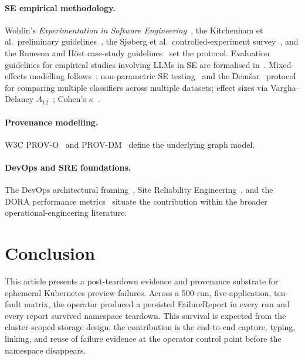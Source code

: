 \documentclass[sigconf, nonacm=true, anonymous=false, review=false]{acmart}
\newcommand{\fp}{FailureReport\xspace}
\begin{document}
\paragraph{SE empirical methodology.} Wohlin's
\emph{Experimentation in Software Engineering}~\cite{wohlin_experimentation},
the Kitchenham et al.\ preliminary
guidelines~\cite{kitchenham_2002}, the Sj{\o}berg et al.\
controlled-experiment survey~\cite{sjoberg_2005}, and the Runeson
and H{\"o}st case-study guidelines~\cite{runeson_host_2009} set the
protocol. Evaluation guidelines for empirical studies involving
LLMs in SE are formalised in~\cite{se_llm_guidelines}.
Mixed-effects modelling follows~\cite{bates_lme4_2015,
baayen_2008, brown_lmm_2021}; non-parametric SE
testing~\cite{arcuri_briand_2014} and the
Dem{\v{s}}ar~\cite{demsar_2006} protocol for comparing multiple
classifiers across multiple datasets; effect sizes via
Vargha--Delaney $A_{12}$~\cite{vargha_delaney_2000};
Cohen's $\kappa$~\cite{mchugh_kappa_2012}.

\paragraph{Provenance modelling.} W3C PROV-O~\cite{lebo_provo_2013}
and PROV-DM~\cite{w3c_prov_dm} define the underlying graph model.

\paragraph{DevOps and SRE foundations.} The DevOps architectural
framing~\cite{bass_devops_2015}, Site Reliability
Engineering~\cite{beyer_sre_2016}, and the DORA performance
metrics~\cite{forsgren_accelerate_2018} situate the contribution
within the broader operational-engineering literature.

\section{Conclusion}
\label{sec:conclusion}

This article presents a post-teardown evidence and provenance substrate for
ephemeral Kubernetes preview failures. Across a 500-run, five-application,
ten-fault matrix, the operator produced a persisted \fp{} in every run and
every report survived namespace teardown. This survival is expected from
the cluster-scoped storage design; the contribution is the end-to-end
capture, typing, linking, and reuse of failure evidence at the operator
control point before the namespace disappears.
\end{document}
